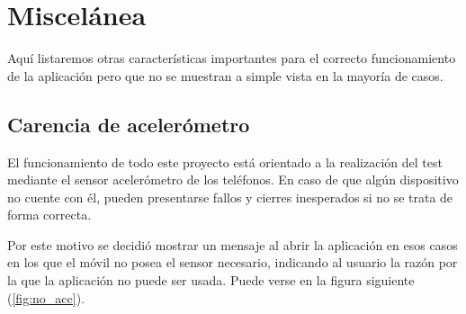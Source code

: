\section{Miscelánea}

Aquí listaremos otras características importantes para el correcto funcionamiento de la aplicación pero que no se muestran a simple vista en la mayoría de casos.

\subsection{Carencia de acelerómetro}

El funcionamiento de todo este proyecto está orientado a la realización del test mediante el sensor acelerómetro de los teléfonos. En caso de que algún dispositivo no cuente con él, pueden presentarse fallos y cierres inesperados si no se trata de forma correcta. 

Por este motivo se decidió mostrar un mensaje al abrir la aplicación en esos casos en los que el móvil no posea el sensor necesario, indicando al usuario la razón por la que la aplicación no puede ser usada. Puede verse en la figura siguiente (\ref{fig:no_acc}).


